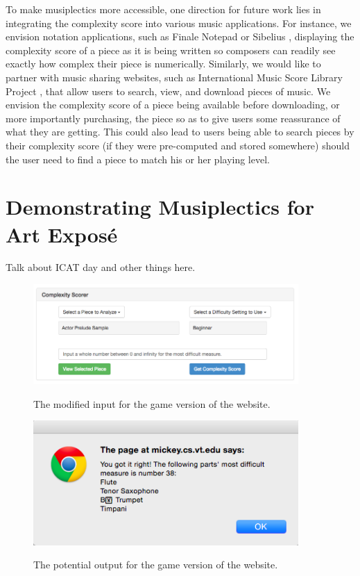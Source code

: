 \documentclass[12pt]{report}
\begin{document}
To make musiplectics more accessible, one direction for future work lies in integrating the complexity score into various music applications. For instance, we envision notation applications, such as Finale Notepad \cite{FinaleNotepad} or Sibelius \cite{Sibelius}, displaying the complexity score of a piece as it is being written so composers can readily see exactly how complex their piece is numerically. Similarly, we would like to partner with music sharing websites, such as International Music Score Library Project \cite{IMSLP}, that allow users to search, view, and download pieces of music. We envision the complexity score of a piece being available before downloading, or more importantly purchasing, the piece so as to give users some reassurance of what they are getting. This could also lead to users being able to search pieces by their complexity score (if they were pre-computed and stored somewhere) should the user need to find a piece to match his or her playing level.

\section{Demonstrating Musiplectics for Art Expos\'e}
\label{sec:icat}

Talk about ICAT day and other things here.


\begin{figure}[ht!] 
	\centering
		\caption{The modified input for the game version of the website.}
		\includegraphics[width=0.9\textwidth]{WebsiteGameInput.png}
		\label{image:websitegameinput}
\end{figure}

\begin{figure}[ht!]
	\centering
		\caption{The potential output for the game version of the website.}
		\includegraphics[width=0.9\textwidth]{WebsiteGameOutput.png}
		\label{image:websitegameoutput}
\end{figure}
\end{document}
